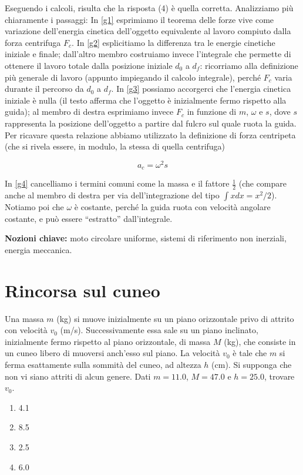 \noindent Eseguendo i calcoli, risulta che la risposta
(4) è quella corretta. Analizziamo più chiaramente i passaggi:
In \ref{g1} esprimiamo il teorema delle forze vive
come variazione dell'energia cinetica dell'oggetto
equivalente al lavoro compiuto dalla forza centrifuga $F_c$.
In \ref{g2} esplicitiamo la differenza tra le energie
cinetiche iniziale e finale; dall'altro membro costruiamo
invece l'integrale che permette di ottenere il lavoro
totale dalla posizione iniziale $d_0$ a $d_f$: ricorriamo
alla definizione più generale di lavoro (appunto impiegando
il calcolo integrale), perché $F_c$ varia durante il
percorso da $d_0$ a $d_f$. In \ref{g3} possiamo accorgerci
che l'energia cinetica iniziale è nulla (il testo afferma
che l'oggetto è inizialmente fermo rispetto alla guida);
al membro di destra esprimiamo invece $F_c$ in funzione
di $m$, $\omega$ e $s$, dove $s$ rappresenta la posizione
dell'oggetto a partire dal fulcro sul quale ruota la guida.
Per ricavare questa relazione
abbiamo utilizzato la definizione di forza centripeta
(che si rivela essere, in modulo, la stessa di quella
centrifuga)

\[ a_c = \omega^2 s \]

\noindent In \ref{g4} cancelliamo i termini comuni
come la massa e il fattore $\frac12$ (che compare
anche al membro di destra per via dell'integrazione
del tipo $\int xdx = x^2/2$). Notiamo poi che $\omega$
è costante, perché la guida ruota con velocità angolare
costante, e può essere ``estratto'' dall'integrale.

\noindent \textbf{Nozioni chiave:} moto circolare uniforme, sistemi
di riferimento non inerziali, energia meccanica.


\section{Rincorsa sul cuneo}
Una massa $m$ (kg) si muove inizialmente su un piano
orizzontale privo di attrito con velocità $v_0$ (m/s).
Successivamente essa sale su un piano inclinato, inizialmente
fermo rispetto al piano orizzontale, di
massa $M$ (kg), che consiste in un cuneo libero di
muoversi anch'esso sul piano. La velocità $v_0$ è
tale che $m$ si ferma esattamente sulla sommità del
cuneo, ad altezza $h$ (cm). Si supponga che non vi
siano attriti di alcun genere. Dati $m = 11.0$, $M = 47.0$
e $h = 25.0$, trovare $v_0$.

\begin{enumerate}
    \item 4.1
    \item 8.5
    \item 2.5
    \item 6.0
\end{enumerate}

